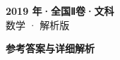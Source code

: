 \documentclass[zihao=-4, a4paper]{ctexart}
\begin{document}
\begin{center}
  {\Large\bfseries 2019 年·全国Ⅱ卷·文科}\\[4pt]
  {\large 数学 · 解析版}
\end{center}
\medskip
{}

\clearpage
{}
\begin{center}{\Large\bfseries 参考答案与详细解析}\end{center}
\medskip

\end{document}
